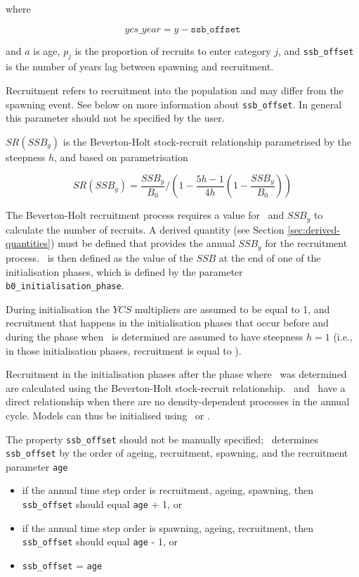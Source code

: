 where

\begin{equation}\label{eq:year_class}
ycs\_year = y - \texttt{ssb\_offset}
\end{equation}

and $a$ is age, $p_j$ is the proportion of recruits to enter category $j$, and \texttt{ssb\_offset} is the number of years lag between spawning and recruitment.

Recruitment refers to recruitment into the population and may differ from the spawning event. See below on more information about \texttt{ssb\_offset}. In general this parameter should not be specified by the user.

$SR(SSB_y)$ is the Beverton-Holt stock-recruit relationship parametrised by the steepness $h$, and based on \cite{mace_doonan_88} parametrisation

\begin{equation}\label{eq:BH_SR}
SR(SSB_y) = \frac{SSB_y}{B_0} / \left( 1-\frac{5h-1}{4h} \left( 1-\frac{SSB_y}{B_0} \right) \right)
\end{equation}

The Beverton-Holt recruitment process requires a value for \Bzero\ and $SSB_y$ to calculate the number of recruits. A derived quantity (see Section \ref{sec:derived-quantities}) must be defined that provides the annual $SSB_y$ for the recruitment process. \Bzero\ is then defined as the value of the $SSB$ at the end of one of the initialisation phases, which is defined by the parameter \texttt{b0\_initialisation\_phase}.

During initialisation the $YCS$ multipliers are assumed to be equal to 1, and recruitment that happens in the initialisation phases that occur before and during the phase when \Bzero\ is determined are assumed to have steepness $h=1$ (i.e., in those initialisation phases, recruitment is equal to \Rzero).

Recruitment in the initialisation phases after the phase where \Bzero\ was determined are calculated using the Beverton-Holt stock-recruit relationship. \Rzero\ and \Bzero\ have a direct relationship when there are no density-dependent processes in the annual cycle. Models can thus be initialised using \Bzero\ or \Rzero.

The property \texttt{ssb\_offset} should not be manually specified; \CNAME\ determines \texttt{ssb\_offset} by the order of ageing, recruitment, spawning, and the recruitment parameter \texttt{age}

\begin{itemize}
	\item if the annual time step order is recruitment, ageing, spawning, then \texttt{ssb\_offset} should equal \texttt{age} + 1, or
	\item if the annual time step order is spawning, ageing, recruitment, then \texttt{ssb\_offset} should equal \texttt{age} - 1, or
	\item \texttt{ssb\_offset} = \texttt{age}
\end{itemize}

